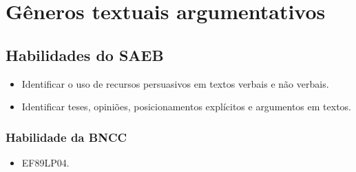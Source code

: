
\chapter{Gêneros textuais argumentativos}

\section{Habilidades do SAEB}

\begin{itemize}
\tightlist
\item
  Identificar o uso de recursos persuasivos em textos verbais e não
  verbais.
\item
  Identificar teses, opiniões, posicionamentos explícitos e argumentos
  em textos.
\end{itemize}

\subsection{Habilidade da BNCC}

\begin{itemize}
\tightlist
\item
  EF89LP04.
\end{itemize}

